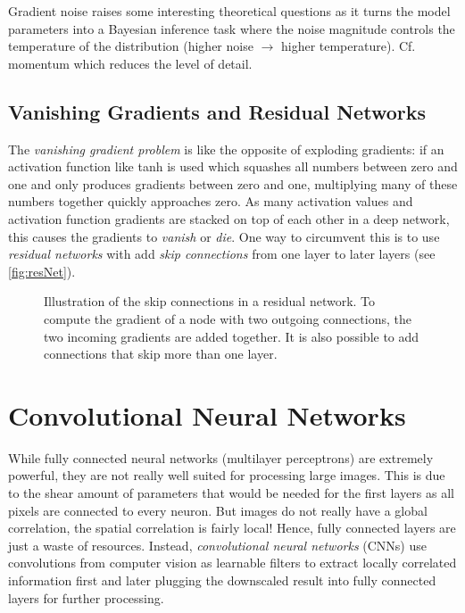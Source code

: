 		Gradient noise raises some interesting theoretical questions as it turns the model parameters into a Bayesian inference task where the noise magnitude controls the temperature of the distribution (higher noise \(\to\) higher temperature). Cf. momentum which reduces the level of detail.

	\section{Vanishing Gradients and Residual Networks}
		The \emph{vanishing gradient problem} is like the opposite of exploding gradients: if an activation function like tanh is used which squashes all numbers between zero and one and only produces gradients between zero and one, multiplying many of these numbers together quickly approaches zero. As many activation values and activation function gradients are stacked on top of each other in a deep network, this causes the gradients to \emph{vanish} or \emph{die}. One way to circumvent this is to use \emph{residual networks} with add \emph{skip connections} from one layer to later layers (see \autoref{fig:resNet}).

		\begin{figure}
			\centering
			\caption{Illustration of the skip connections in a residual network. To compute the gradient of a node with two outgoing connections, the two incoming gradients are added together. It is also possible to add connections that skip more than one layer.}
			\label{fig:resNet}
		\end{figure}

\chapter{Convolutional Neural Networks}
	While fully connected neural networks (multilayer perceptrons) are extremely powerful, they are not really well suited for processing large images. This is due to the shear amount of parameters that would be needed for the first layers as all pixels are connected to every neuron. But images do not really have a global correlation, the spatial correlation is fairly local! Hence, fully connected layers are just a waste of resources. Instead, \emph{convolutional neural networks} (CNNs) use convolutions from computer vision as learnable filters to extract locally correlated information first and later plugging the downscaled result into fully connected layers for further processing.

